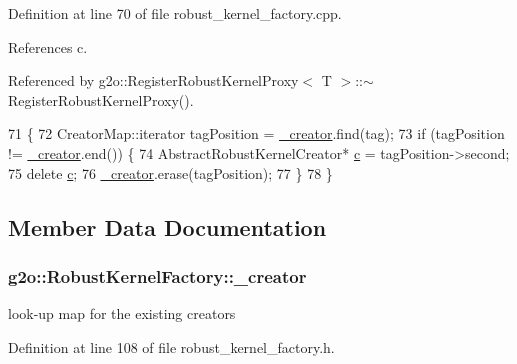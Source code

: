 Definition at line 70 of file robust\+\_\+kernel\+\_\+factory.\+cpp.



References c.



Referenced by g2o\+::\+Register\+Robust\+Kernel\+Proxy$<$ T $>$\+::$\sim$\+Register\+Robust\+Kernel\+Proxy().


\begin{DoxyCode}
71 \{
72   CreatorMap::iterator tagPosition = \hyperlink{classg2o_1_1RobustKernelFactory_af5f3cea409d3f18baa40da898d21424b}{\_creator}.find(tag);
73   \textcolor{keywordflow}{if} (tagPosition != \hyperlink{classg2o_1_1RobustKernelFactory_af5f3cea409d3f18baa40da898d21424b}{\_creator}.end()) \{
74     AbstractRobustKernelCreator* \hyperlink{sparse__block__matrix_8hpp_a4e1e0e72dd773439e333c84dd762a9c3}{c} = tagPosition->second;
75     \textcolor{keyword}{delete} \hyperlink{sparse__block__matrix_8hpp_a4e1e0e72dd773439e333c84dd762a9c3}{c};
76     \hyperlink{classg2o_1_1RobustKernelFactory_af5f3cea409d3f18baa40da898d21424b}{\_creator}.erase(tagPosition);
77   \}
78 \}
\end{DoxyCode}


\subsection{Member Data Documentation}
\subsubsection[{\texorpdfstring{\+\_\+creator}{_creator}}]{ g2o\+::\+Robust\+Kernel\+Factory\+::\+\_\+creator\hspace{0.3cm}{\ttfamily [protected]}}\hypertarget{classg2o_1_1RobustKernelFactory_af5f3cea409d3f18baa40da898d21424b}{}\label{classg2o_1_1RobustKernelFactory_af5f3cea409d3f18baa40da898d21424b}


look-\/up map for the existing creators 



Definition at line 108 of file robust\+\_\+kernel\+\_\+factory.\+h.

